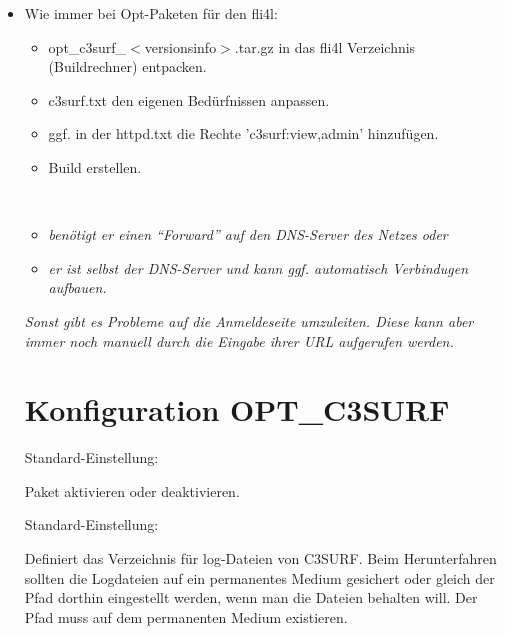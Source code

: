 \begin{itemize}
\item Wie immer bei Opt-Paketen für den fli4l:
  \begin{itemize}
     \item opt\_c3surf\_$<$versionsinfo$>$.tar.gz in das fli4l Verzeichnis (Buildrechner) entpacken.
     \item c3surf.txt den eigenen Bedürfnissen anpassen.
     \item ggf. in der httpd.txt die Rechte 'c3surf:view,admin' hinzufügen.
     \item Build erstellen.\\
\end{itemize}
\\    
          \begin{itemize}

                \item \emph{benötigt er einen ``Forward'' auf den DNS-Server des Netzes oder}
                \item \emph{er ist selbst der DNS-Server und kann ggf. automatisch Verbindugen aufbauen.}
          \end{itemize}
               
               \emph{Sonst gibt es Probleme auf die Anmeldeseite umzuleiten. Diese kann aber immer
               noch manuell durch die Eingabe ihrer URL aufgerufen werden.}

\section {Konfiguration OPT\_C3SURF}
\begin{description}


  Standard-Einstellung: 

  Paket aktivieren oder deaktivieren.


  Standard-Einstellung: 

  Definiert das Verzeichnis für log-Dateien von C3SURF. Beim
  Herunterfahren sollten die Logdateien auf ein permanentes
  Medium gesichert oder gleich der Pfad dorthin eingestellt werden,
  wenn man die Dateien behalten will. Der Pfad muss auf dem
  permanenten Medium existieren.


\end{description}
\end{itemize}
